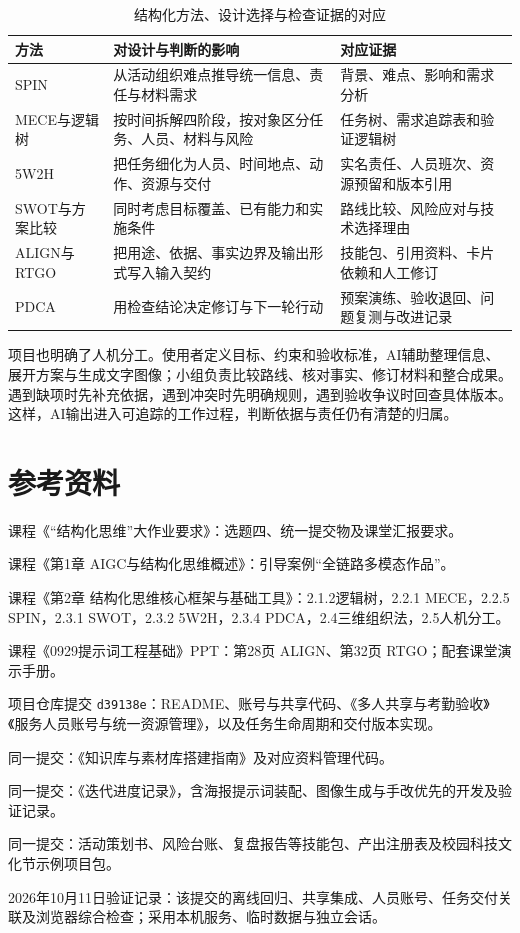 \documentclass[UTF8,fontset=windows,zihao=-4,a4paper]{ctexart}
\begin{document}
\begin{table}[H]\centering\small
\caption{结构化方法、设计选择与检查证据的对应}
\label{tab:method-value}
\begin{tabularx}{\textwidth}{L{2.2cm}Y Y}
\toprule
方法 & 对设计与判断的影响 & 对应证据 \\
\midrule
SPIN & 从活动组织难点推导统一信息、责任与材料需求 & 背景、难点、影响和需求分析 \\
MECE与逻辑树 & 按时间拆解四阶段，按对象区分任务、人员、材料与风险 & 任务树、需求追踪表和验证逻辑树 \\
5W2H & 把任务细化为人员、时间地点、动作、资源与交付 & 实名责任、人员班次、资源预留和版本引用 \\
SWOT与方案比较 & 同时考虑目标覆盖、已有能力和实施条件 & 路线比较、风险应对与技术选择理由 \\
ALIGN与RTGO & 把用途、依据、事实边界及输出形式写入输入契约 & 技能包、引用资料、卡片依赖和人工修订 \\
PDCA & 用检查结论决定修订与下一轮行动 & 预案演练、验收退回、问题复测与改进记录 \\
\bottomrule
\end{tabularx}
\end{table}

项目也明确了人机分工。使用者定义目标、约束和验收标准，AI辅助整理信息、展开方案与生成文字图像；小组负责比较路线、核对事实、修订材料和整合成果。遇到缺项时先补充依据，遇到冲突时先明确规则，遇到验收争议时回查具体版本。这样，AI输出进入可追踪的工作过程，判断依据与责任仍有清楚的归属。

\Needspace{0.40\textheight}
\section*{参考资料}
\begingroup\small
\begin{enumerate}[label={[\arabic*]},leftmargin=2.5em,itemsep=3pt]
\item 课程《“结构化思维”大作业要求》：选题四、统一提交物及课堂汇报要求。
\item 课程《第1章 AIGC与结构化思维概述》：引导案例“全链路多模态作品”。
\item 课程《第2章 结构化思维核心框架与基础工具》：2.1.2逻辑树，2.2.1 MECE，2.2.5 SPIN，2.3.1 SWOT，2.3.2 5W2H，2.3.4 PDCA，2.4三维组织法，2.5人机分工。
\item 课程《0929提示词工程基础》PPT：第28页 ALIGN、第32页 RTGO；配套课堂演示手册。
\item 项目仓库提交 \texttt{d39138e}：README、账号与共享代码、《多人共享与考勤验收》《服务人员账号与统一资源管理》，以及任务生命周期和交付版本实现。
\item 同一提交：《知识库与素材库搭建指南》及对应资料管理代码。
\item 同一提交：《迭代进度记录》，含海报提示词装配、图像生成与手改优先的开发及验证记录。
\item 同一提交：活动策划书、风险台账、复盘报告等技能包、产出注册表及校园科技文化节示例项目包。
\item 2026年10月11日验证记录：该提交的离线回归、共享集成、人员账号、任务交付关联及浏览器综合检查；采用本机服务、临时数据与独立会话。
\end{enumerate}

\endgroup
\end{document}
